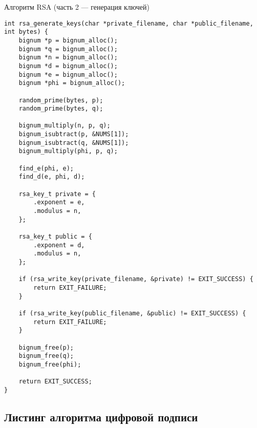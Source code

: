 \begin{listing}[!h]
	\caption{Алгоритм RSA (часть 2 --- генерация ключей)}
	\label{lst:socket}
	\begin{verbatim}
int rsa_generate_keys(char *private_filename, char *public_filename, int bytes) {
	bignum *p = bignum_alloc();
	bignum *q = bignum_alloc();
	bignum *n = bignum_alloc();
	bignum *d = bignum_alloc();
	bignum *e = bignum_alloc();
	bignum *phi = bignum_alloc();
	
	random_prime(bytes, p);
	random_prime(bytes, q);
	
	bignum_multiply(n, p, q);
	bignum_isubtract(p, &NUMS[1]);
	bignum_isubtract(q, &NUMS[1]);
	bignum_multiply(phi, p, q);
	
	find_e(phi, e);
	find_d(e, phi, d);
	
	rsa_key_t private = {
		.exponent = e,
		.modulus = n,
	};
	
	rsa_key_t public = {
		.exponent = d,
		.modulus = n,
	};
	
	if (rsa_write_key(private_filename, &private) != EXIT_SUCCESS) {
		return EXIT_FAILURE;
	}
	
	if (rsa_write_key(public_filename, &public) != EXIT_SUCCESS) {
		return EXIT_FAILURE;
	}
	
	bignum_free(p);
	bignum_free(q);
	bignum_free(phi);
	
	return EXIT_SUCCESS;
}
	\end{verbatim}
\end{listing}


\subsection{Листинг алгоритма цифровой подписи}

